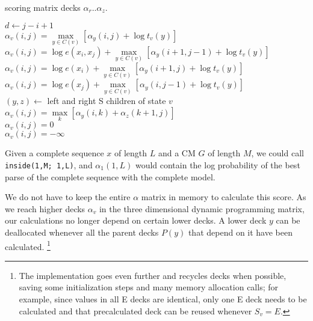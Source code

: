 \documentclass[11pt]{article}
\begin{document}
\begin{algorithm}
         {scoring matrix decks $\alpha_r..\alpha_z$.}
\begin{algtab}
       $d \leftarrow j-i+1$\\
       	$\alpha_v(i,j) = \max\limits_{y \in C(v)} \left[ \alpha_y(i,j)  + \log t_v(y) \right]$\\
	$\alpha_v(i,j) = \log e(x_i, x_j) + \max\limits_{y \in C(v)} \left[ \alpha_y(i+1,j-1) + \log t_v(y) \right]$\\
        $\alpha_v(i,j) = \log e(x_i) + \max\limits_{y \in C(v)} \left[ \alpha_y(i+1,j)   + \log t_v(y) \right]$\\
        $\alpha_v(i,j) = \log e(x_j) +      \max\limits_{y \in C(v)} \left[ \alpha_y(i,j-1)   + \log t_v(y) \right]$ \\
        $(y,z) \leftarrow $ left and right S children of state $v$\\
        $\alpha_v(i,j) = \max\limits_k \left[ \alpha_y(i,k) + \alpha_z(k+1,j) \right]$ \\
	$\alpha_v(i,j) = 0$\\
       \algelse
	$\alpha_v(i,j) = -\infty$\\
\end{algtab}
\end{algorithm}

Given a complete sequence $x$ of length $L$ and a CM $G$ of length
$M$, we could call \texttt{inside(1,M; 1,L)}, and $\alpha_1(1,L)$
would contain the log probability of the best parse of the complete
sequence with the complete model.

We do not have to keep the entire $\alpha$ matrix in memory to
calculate this score.  As we reach higher decks $\alpha_v$ in the
three dimensional dynamic programming matrix, our calculations no
longer depend on certain lower decks. A lower deck $y$ can be
deallocated whenever all the parent decks $P(y)$ that depend on it
have been calculated. \footnote{The implementation goes even further
and recycles decks when possible, saving some initialization steps and
many memory allocation calls; for example, since values in all E decks
are identical, only one E deck needs to be calculated and that
precalculated deck can be reused whenever $S_v = E$.}
\end{document}
